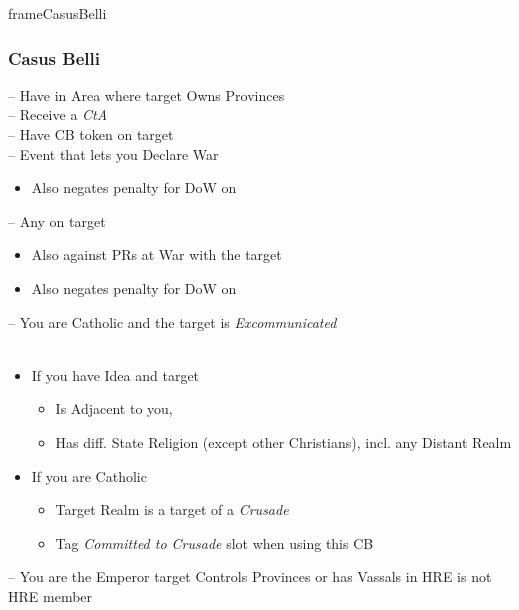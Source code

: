 \documentclass[10pt]{article}
\newlength{\fhCasusBelli} \setlength\fhCasusBelli{24\baselineskip}
\begin{document}
\begin{dynamiccontents*}{frameCasusBelli}\begin{eubox}{\fhCasusBelli}
	\subsubsection*{Casus Belli }
	 -- Have \claim in Area where target Owns Provinces\\
	 -- Receive a \emph{CtA}\\
	 -- Have CB token on target\\
	 -- Event that lets you Declare War\\
	\begin{itemize}
		\item {}Also negates penalty for DoW on \marriage
	\end{itemize}
	 -- Any \disputedsuccession on target\\
	\begin{itemize}
		\item Also against PRs at War with the target
		\item {}Also negates penalty for DoW on \marriage
	\end{itemize}
	 -- You are Catholic and the target is \emph{Excommunicated}\\
	\\
	\begin{itemize}
		\item If you have  Idea and target
		\begin{itemize}
			\item Is Adjacent to you, 
			\item Has diff. State Religion (except other Christians), incl. any Distant Realm
		\end{itemize}
		\item If you are Catholic
		\begin{itemize}
			\item Target Realm is a target of a \emph{Crusade}
			\item Tag \emph{Committed to Crusade} slot when using this CB
		\end{itemize}
	\end{itemize}
	 -- You are the Emperor  target Controls Provinces or has Vassals in HRE  is not HRE member
\end{eubox}\end{dynamiccontents*}
\end{document}
